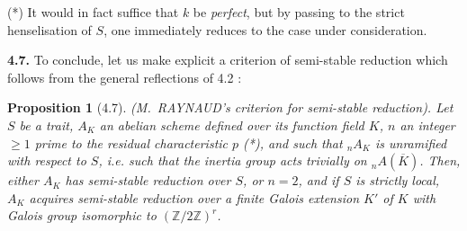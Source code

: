 \documentclass[11pt]{article}
\newtheorem{proposition}{Proposition}[section]
\newcommand{\ZZ}{\mathbb Z}
\begin{document}
\medskip

\noindent (*) It would in fact suffice that $k$ be \emph{perfect}, but
by passing to the strict henselisation of $S$, one immediately reduces
to the case under consideration.


\medskip

\noindent\textbf{4.7.} To conclude, let us make explicit a criterion of
semi-stable reduction which follows from the general reflections of 4.2 :

\begin{proposition}[4.7]
\emph{(M.~RAYNAUD's criterion for semi-stable reduction).} Let $S$ be a
trait, $A_K$ an abelian scheme defined over its function field $K$, $n$
an integer $\geq 1$ prime to the residual characteristic $p$ (*), and
such that ${}_n A_K$ is unramified with respect to $S$, i.e. such that
the inertia group acts trivially on ${}_n A(\overline{K})$. Then, either
$A_K$ has semi-stable reduction over $S$, or $n = 2$, and if $S$ is
strictly local, $A_K$ acquires semi-stable reduction over a finite
Galois extension $K'$ of $K$ with Galois group isomorphic to
$(\ZZ/2\ZZ)^r$.
\end{proposition}
\end{document}
